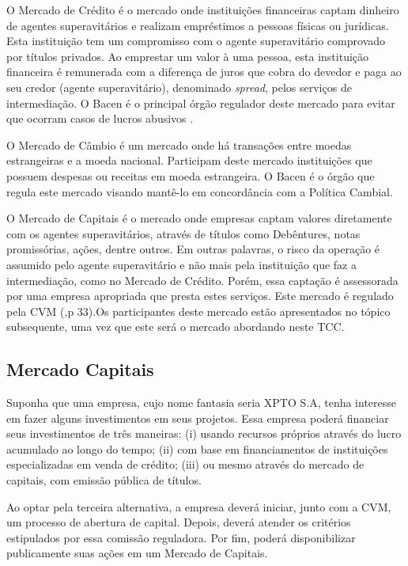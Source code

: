 O Mercado de Crédito é o mercado onde instituições financeiras captam dinheiro de agentes superavitários e realizam empréstimos a pessoas físicas ou jurídicas. Esta instituição tem um compromisso com o agente superavitário comprovado por títulos privados. Ao emprestar um valor à uma pessoa, esta instituição financeira é remunerada com a diferença de juros que cobra do devedor e paga ao seu credor (agente superavitário), denominado \textit{spread}, pelos serviços de intermediação. O Bacen é o principal órgão regulador deste mercado para evitar que ocorram casos de lucros abusivos \cite[p. 32]{cmv2014}.

O Mercado de Câmbio é um mercado onde há transações entre moedas estrangeiras e a moeda nacional. Participam deste mercado instituições que possuem despesas ou receitas em moeda estrangeira. O Bacen é o órgão que regula este mercado visando mantê-lo em concordância com a Política Cambial\cite[p. 32]{cmv2014}.

O Mercado de Capitais é o mercado onde empresas captam valores diretamente com os agentes superavitários, através de títulos como Debêntures, notas promissórias, ações, dentre outros. Em outras palavras, o risco da operação é assumido pelo agente superavitário e não mais pela instituição que faz a intermediação, como no Mercado de Crédito. Porém, essa captação é assessorada por uma empresa apropriada que presta estes serviços. Este mercado é regulado pela CVM (\citeyear{cmv2014},p 33).Os participantes deste mercado estão apresentados no tópico subsequente, uma vez que este será o mercado abordando neste TCC.

\subsection{Mercado Capitais}

Suponha que uma empresa, cujo nome fantasia seria XPTO S.A, tenha interesse em fazer alguns investimentos em seus projetos. Essa empresa poderá financiar seus investimentos de três maneiras: (i) usando recursos próprios através do lucro acumulado ao longo do tempo; (ii) com base em financiamentos de instituições especializadas em venda de crédito; (iii) ou mesmo através do mercado de capitais, com emissão pública de títulos.
	
Ao optar pela terceira alternativa, a empresa deverá iniciar, junto com a CVM, um processo de abertura de capital. Depois, deverá atender os critérios estipulados por essa comissão reguladora. Por fim, poderá disponibilizar publicamente suas ações  em um Mercado de Capitais. 

